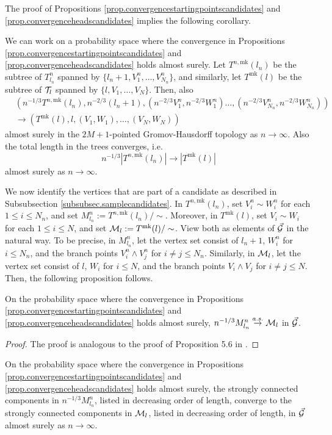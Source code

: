 The proof of Propositions \ref{prop.convergencestartingpointscandidates} and \ref{prop.convergenceheadscandidates} implies the following corollary.
\begin{corollary}
We can work on a probability space where the convergence in Propositions \ref{prop.convergencestartingpointscandidates} and \ref{prop.convergenceheadscandidates} holds almost surely. Let $T^{n,\text{mk}}(l_n)$ be the subtree of $T^n_{l_n}$ spanned by $\{l_n+1,V^n_1,\dots,V^n_{N_n}\}$, and similarly, let $T^{\text{mk}}(l)$ be the subtree of ${\mathcal T}_l$ spanned by $\{l,V_1,\dots,V_N\}$. Then, also 
\begin{align*}&\left(n^{-1/3}T^{n,\text{mk}}(l_n), n^{-2/3}(l_n+1), \left(n^{-2/3}V^n_1,n^{-2/3}W^n_1\right) \dots, \left(n^{-2/3}V^n_{N_n}, n^{-2/3}W^n_{N_n}\right)\right)\\
&\to \left(T^{\text{mk}}(l), l, (V_1,W_1),\dots, (V_{N},W_{N})\right)\end{align*}
almost surely in the $2M+1$-pointed Gromov-Hausdorff topology as $n\to \infty$. Also the total length in the trees converges, i.e.
$$n^{-1/3}\left|T^{n,\text{mk}}(l_n)\right|\to \left| T^{\text{mk}}(l)\right|$$
almost surely as $n\to\infty$.
\end{corollary}
We now identify the vertices that are part of a candidate as described in Subsubsection \ref{subsubsec.samplecandidates}. In $T^{n,\text{mk}}(l_n)$, set $V_i^n\sim W_i^n$ for each $1\leq i\leq N_n$, and set $M^n_{l_n}:=T^{n,\text{mk}}(l_n)/\sim$. Moreover, in $T^{\text{mk}}(l)$, set $V_i\sim W_i$ for each $1\leq i\leq N$, and set ${\mathcal M}_l:=T^{\text{mk}}(l)/\sim$. View both as elements of $\vec{{\mathcal G}}$ in the natural way. To be precise, in  $M^n_{l_n}$, let the vertex set consist of $l_n+1$, $W_i^n$ for $i\leq N_n$, and the branch points $V_i^n\wedge V_j^n$ for $i\neq j\leq N_n$. Similarly, in ${\mathcal M}_l$, let the vertex set consist of $l$, $W_i$ for $i\leq N$, and the branch points $V_i\wedge V_j$ for $i\neq j\leq N$. Then, the following proposition follows.
\begin{proposition}
On the probability space where the convergence in Propositions \ref{prop.convergencestartingpointscandidates} and \ref{prop.convergenceheadscandidates} holds almost surely, 
$n^{-1/3}M^n_{l_n}\overset{a.s.}{\to} {\mathcal M}_l$
in $\vec{{\mathcal G}}$.
\end{proposition}
\begin{proof}
The proof is analogous to the proof of Proposition 5.6 in \cite{goldschmidtScalingLimitCritical2019}.
\end{proof}
\begin{corollary}\label{cor.sccsinonetreeconverge}
On the probability space where the convergence in Propositions \ref{prop.convergencestartingpointscandidates} and \ref{prop.convergenceheadscandidates} holds almost surely, the strongly connected components in $n^{-1/3}M^n_{l_n}$, listed in decreasing order of length, converge to the strongly connected components in ${\mathcal M}_l$, listed in decreasing order of length, in $\vec{{\mathcal G}}$ almost surely as $n\to \infty$.
\end{corollary}
